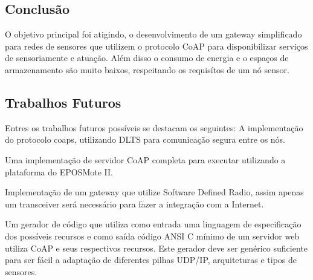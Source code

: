 \subsection{Conclus\~ao}

O objetivo principal foi atigindo, o desenvolvimento de um gateway simplificado para redes de sensores que utilizem o protocolo CoAP para disponibilizar servi\c{c}os de sensoriamente e atua\c{c}\~ao.
Al\'em disso o consumo de energia e o espa\c{c}os de armazenamento s\~ao muito baixos, respeitando os requis\'itos de um n\'o sensor.


\subsection{Trabalhos Futuros}

Entres os trabalhos futuros poss\'iveis se destacam os seguintes:
A implementa\c{c}\~ao do protocolo coaps, utilizando DLTS para comunica\c{c}\~ao segura entre os n\'os.

Uma implementa\c{c}\~ao de servidor CoAP completa para executar utilizando a plataforma do EPOSMote II.

Implementa\c{c}\~ao de um gateway que utilize Software Defined Radio, assim apenas um transceiver ser\'a necess\'ario para
fazer a integra\c{c}\~ao com a Internet.

Um gerador de c\'odigo que utiliza como entrada uma linguagem de especifica\c{c}\~ao dos poss\'iveis recursos e como sa\'ida c\'odigo ANSI C m\'inimo de um servidor web utiliza CoAP e seus respectivos recursos. Este gerador deve ser gen\'erico suficiente para ser f\'acil a adapta\c{c}\~ao de diferentes pilhas UDP/IP, arquiteturas e tipos de sensores.


